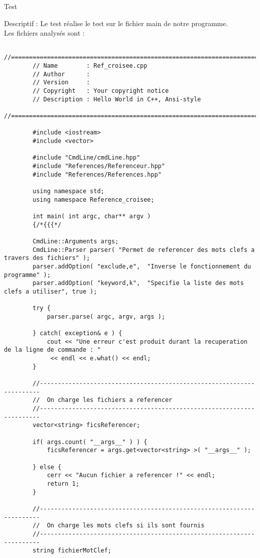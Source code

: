 \documentclass{article}
\begin{document}
   \newpage 
  
  \begin{subsection}{Test }
    
    \begin{paragraph}{Descriptif :}
	Le test  réalise le test sur le fichier main de notre programme.\\ Les fichiers analysés sont : 
      
      \begin{verbatim}
	    //============================================================================
	    // Name        : Ref_croisee.cpp
	    // Author      :
	    // Version     :
	    // Copyright   : Your copyright notice
	    // Description : Hello World in C++, Ansi-style
	    //============================================================================

	    #include <iostream>
	    #include <vector>

	    #include "CmdLine/cmdLine.hpp"
	    #include "References/Referenceur.hpp"
	    #include "References/References.hpp"

	    using namespace std;
	    using namespace Reference_croisee;

	    int main( int argc, char** argv )
	    {/*{{{*/

		CmdLine::Arguments args;
		CmdLine::Parser parser( "Permet de referencer des mots clefs a travers des fichiers" );
		parser.addOption( "exclude,e",  "Inverse le fonctionnement du programme" );
		parser.addOption( "keyword,k",  "Specifie la liste des mots clefs a utiliser", true );

		try {
		    parser.parse( argc, argv, args );

		} catch( exception& e ) {
		    cout << "Une erreur c'est produit durant la recuperation de la ligne de commande : "
			 << endl << e.what() << endl;
		}

		//----------------------------------------------------------------------
		//  On charge les fichiers a referencer
		//----------------------------------------------------------------------
		vector<string> ficsReferencer;

		if( args.count( "__args__" ) ) {
		    ficsReferencer = args.get<vector<string> >( "__args__" );

		} else {
		    cerr << "Aucun fichier a referencer !" << endl;
		    return 1;
		}

		//----------------------------------------------------------------------
		//  On charge les mots clefs si ils sont fournis
		//----------------------------------------------------------------------
		string fichierMotClef;


\end{verbatim}
\end{paragraph}
\end{subsection}
\end{document}
